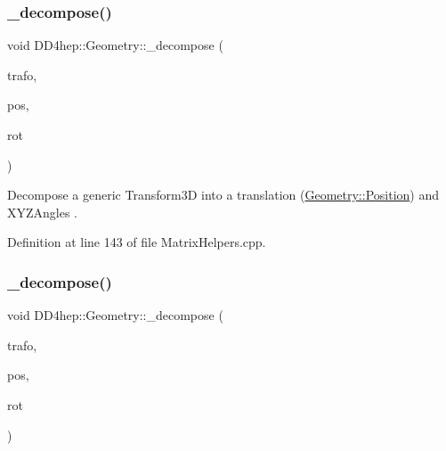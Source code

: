 \subsubsection{\texorpdfstring{\+\_\+decompose()}{\_decompose()}\hspace{0.1cm}{\footnotesize\ttfamily [2/4]}}
{\footnotesize\ttfamily void D\+D4hep\+::\+Geometry\+::\+\_\+decompose (\begin{DoxyParamCaption}\item[{const \hyperlink{namespace_d_d4hep_1_1_geometry_aeb4c0356d12fd7be49a0aae50514e64b}{Geometry\+::\+Transform3D} \&}]{trafo,  }\item[{\hyperlink{namespace_d_d4hep_1_1_geometry_a55083902099d03506c6db01b80404900}{Geometry\+::\+Position} \&}]{pos,  }\item[{\hyperlink{namespace_d_d4hep_1_1_geometry_ab195c63789d4928d291d3b5522151aaa}{X\+Y\+Z\+Angles} \&}]{rot }\end{DoxyParamCaption})}



Decompose a generic Transform3D into a translation (\hyperlink{namespace_d_d4hep_1_1_geometry_a55083902099d03506c6db01b80404900}{Geometry\+::\+Position}) and X\+Y\+Z\+Angles . 



Definition at line 143 of file Matrix\+Helpers.\+cpp.

\hypertarget{group___d_d4_h_e_p___g_e_o_m_e_t_r_y_ga46814636f071d07ca4567f3244884664}{}\label{group___d_d4_h_e_p___g_e_o_m_e_t_r_y_ga46814636f071d07ca4567f3244884664} 
\subsubsection{\texorpdfstring{\+\_\+decompose()}{\_decompose()}\hspace{0.1cm}{\footnotesize\ttfamily [3/4]}}
{\footnotesize\ttfamily void D\+D4hep\+::\+Geometry\+::\+\_\+decompose (\begin{DoxyParamCaption}\item[{const \hyperlink{namespace_d_d4hep_1_1_geometry_aeb4c0356d12fd7be49a0aae50514e64b}{Geometry\+::\+Transform3D} \&}]{trafo,  }\item[{\hyperlink{namespace_d_d4hep_1_1_geometry_ab90afde486c9b46f4fa91bc659271b99}{Geometry\+::\+Translation3D} \&}]{pos,  }\item[{\hyperlink{namespace_d_d4hep_1_1_geometry_a24667b2b9c3cec3d5239828db4d52189}{Geometry\+::\+Rotation\+Z\+YX} \&}]{rot }\end{DoxyParamCaption})}




